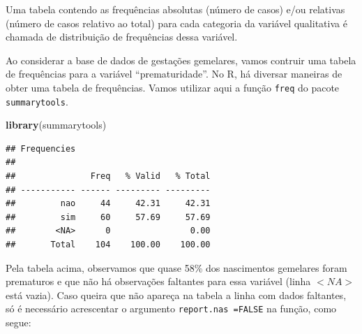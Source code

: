 \documentclass[
]{book}
\newenvironment{Shaded}{\begin{snugshade}}{\end{snugshade}}
\newcommand{\DataTypeTok}[1]{\textcolor[rgb]{0.13,0.29,0.53}{#1}}
\newcommand{\KeywordTok}[1]{\textcolor[rgb]{0.13,0.29,0.53}{\textbf{#1}}}
\newcommand{\NormalTok}[1]{#1}
\newcommand{\OperatorTok}[1]{\textcolor[rgb]{0.81,0.36,0.00}{\textbf{#1}}}
\newcommand{\OtherTok}[1]{\textcolor[rgb]{0.56,0.35,0.01}{#1}}
\begin{document}
Uma tabela contendo as frequências absolutas (número de casos) e/ou relativas (número de casos relativo ao total) para cada categoria da variável qualitativa é chamada de distribuição de frequências dessa variável.

Ao considerar a base de dados de gestações gemelares, vamos contruir uma tabela de frequências para a variável ``prematuridade''. No R, há diversar maneiras de obter uma tabela de frequências. Vamos utilizar aqui a função \texttt{freq} do pacote \texttt{summarytools}.

\begin{Shaded}
\begin{Highlighting}[]
\KeywordTok{library}\NormalTok{(summarytools)}
\end{Highlighting}
\end{Shaded}

\begin{Shaded}
\end{Shaded}

\begin{verbatim}
## Frequencies  
## 
##               Freq   % Valid   % Total
## ----------- ------ --------- ---------
##         nao     44     42.31     42.31
##         sim     60     57.69     57.69
##        <NA>      0                0.00
##       Total    104    100.00    100.00
\end{verbatim}

Pela tabela acima, observamos que quase 58\% dos nascimentos gemelares foram prematuros e que não há observações faltantes para essa variável (linha \(<NA>\) está vazia). Caso queira que não apareça na tabela a linha com dados faltantes, só é necessário acrescentar o argumento \texttt{report.nas\ =FALSE} na função, como segue:

\begin{Shaded}
\end{Shaded}
\end{document}
